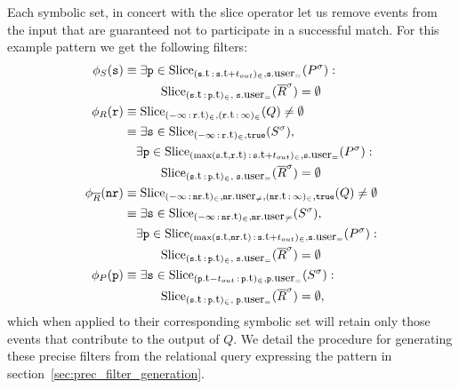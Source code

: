 Each symbolic set, in concert with the slice operator let us remove events from
the input that are guaranteed not to participate in a successful match.
For this example pattern we get the following filters:
\begin{align*}
\precs{S}(\symv{s}) 
&\equiv  
\exists \symv{p} \in 
\slice{\syms{P}}
{(\facc{\symv{s}}{t}\,:\,\facc{\symv{s}}{t} + t_{out})_\in,
	\facc{\symv{s}}{user}_=} :\ 
\\
&\qquad\quad
\slice{\syms{\oR}}
{(\facc{\symv{s}}{t}\,:\,\facc{\symv{p}}{t})_\in,\; \facc{\symv{s}}{user}_=}
= \emptyset 
\\
\precs{R}(\symv{r}) 
&\equiv
\slice{Q}
{(-\infty\,:\,\facc{\symv{r}}{t})_\in, 
	(\facc{\symv{r}}{t}\,:\,\infty)_\in}
\neq \emptyset 
\\
&\equiv
\exists \symv{s} \in 
\slice{\syms{S}}{(-\infty\,:\,\facc{\symv{r}}{t})_\in, \texttt{true}},
\\
&\quad
\exists \symv{p} \in 
\slice{\syms{P}}
{(\max(\facc{\symv{s}}{t},\facc{\symv{r}}{t})\,:\,\facc{\symv{s}}{t} + 
t_{out})_\in,
	\facc{\symv{s}}{user}_=}
: 
\\ 
&\qquad\quad
\slice{\syms{\oR}}
{(\facc{\symv{s}}{t}\,:\,\facc{\symv{p}}{t})_\in,\; \facc{\symv{s}}{user}_=} 
= \emptyset  
\\
\precs{\oR}(\symv{nr}) 
&\equiv
\slice{Q}
{(-\infty\,:\,\facc{\symv{nr}}{t})_\in, 
	\facc{\symv{nr}}{user}_{\neq}, 
	(\facc{\symv{nr}}{t}\,:\,\infty)_\in, 
	\texttt{true}} 
\neq \emptyset 
\\
&\equiv
\exists \symv{s} \in 
\slice{\syms{S}}{(-\infty\,:\,\facc{\symv{nr}}{t})_\in, 
\facc{\symv{nr}}{user}_\neq},
\\
&\quad
\exists \symv{p} \in 
\slice{\syms{P}}
{(\max(\facc{\symv{s}}{t},\facc{\symv{nr}}{t})\,:\,\facc{\symv{s}}{t} + 
t_{out})_\in,
	\facc{\symv{s}}{user}_=}
: 
\\ 
&\qquad\quad
\slice{\syms{\oR}}
{(\facc{\symv{s}}{t}\,:\,\facc{\symv{p}}{t})_\in,\; \facc{\symv{s}}{user}_=} 
= \emptyset  
\\
\precs{P}(\symv{p}) 
&\equiv  
\exists \symv{s} \in 
\slice{\syms{S}}
{(\facc{\symv{p}}{t} - t_{out}\,:\,\facc{\symv{p}}{t})_\in,  
	\facc{\symv{p}}{user}_=} :\
\\
&\qquad\quad
\slice{\syms{\oR}}
{(\facc{\symv{s}}{t}\,:\,\facc{\symv{p}}{t})_\in,\; \facc{\symv{p}}{user}_=}
= \emptyset,
\end{align*}
which when applied to their corresponding symbolic set will retain only those 
events that contribute to the output of $Q$.
We detail the procedure for generating these precise filters from the 
relational query expressing the pattern in 
section~\ref{sec:prec_filter_generation}. 


